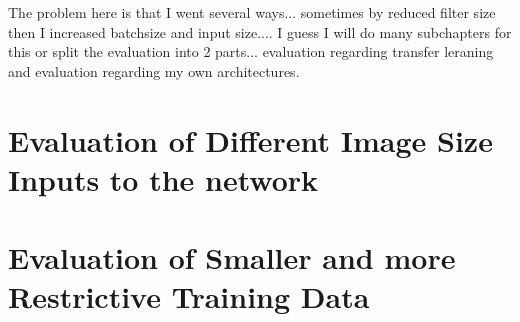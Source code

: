 The problem here is that I went several ways... sometimes by reduced filter size then I increased batchsize and input size.... I guess I will do many subchapters for this or split the evaluation into 2 parts... evaluation regarding transfer leraning and evaluation regarding my own architectures.

\section{Evaluation of Different Image Size Inputs to the network}

\begin{table}[h] \centering
{}
\caption{Resnet18 FiveCrop Implementation with and without pre-training. FINAL (regular) means ResNet18 with the resizing of the image instead of cropping and averaging}
\label{tbl:resnet18-448}
\end{table}

\begin{table}[h] \centering
{}
\caption{Resnet18 FiveCrop Implementation with and without pre-training. FINAL (regular) means ResNet18 with the resizing of the image instead of cropping and averaging}
\label{tbl:resnet18-896}
\end{table}


\begin{table}[h] \centering
{}
\caption{Resnet18 FiveCrop Implementation with and without pre-training. FINAL (regular) means ResNet18 with the resizing of the image instead of cropping and averaging}
\label{tbl:resnet18-1024}
\end{table}

\section{Evaluation of Smaller and more Restrictive Training Data}